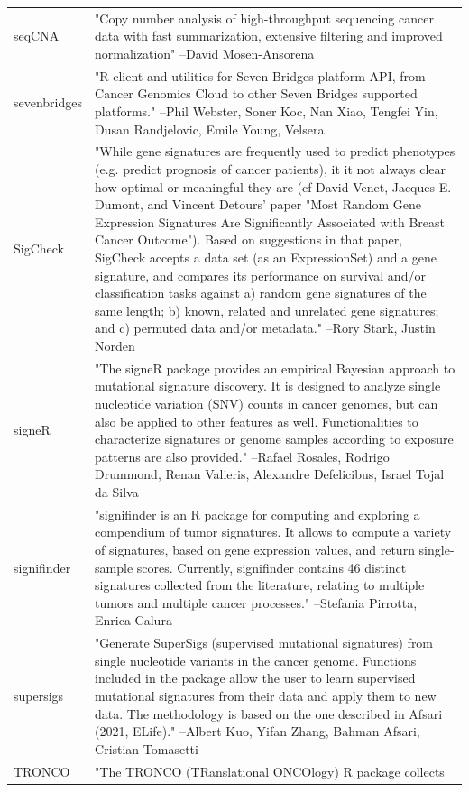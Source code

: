 \begin{longtable}[t]{l>{\raggedright\arraybackslash}p{25em}}
seqCNA & "Copy number analysis of high-throughput sequencing cancer
data with fast summarization, extensive filtering and improved
normalization" --David Mosen-Ansorena\\
sevenbridges & "R client and utilities for Seven Bridges platform API,
from Cancer Genomics Cloud to other Seven Bridges supported
platforms." --Phil Webster, Soner Koc, Nan Xiao, Tengfei Yin, Dusan Randjelovic, Emile Young, Velsera\\
SigCheck & "While gene signatures are frequently used to predict
phenotypes (e.g. predict prognosis of cancer patients), it it
not always clear how optimal or meaningful they are (cf David
Venet, Jacques E. Dumont, and Vincent Detours' paper "Most
Random Gene Expression Signatures Are Significantly Associated
with Breast Cancer Outcome"). Based on suggestions in that
paper, SigCheck accepts a data set (as an ExpressionSet) and a
gene signature, and compares its performance on survival and/or
classification tasks against a) random gene signatures of the
same length; b) known, related and unrelated gene signatures;
and c) permuted data and/or metadata." --Rory Stark, Justin Norden\\
signeR & "The signeR package provides an empirical Bayesian approach
to mutational signature discovery. It is designed to analyze
single nucleotide variation (SNV) counts in cancer genomes, but
can also be applied to other features as well. Functionalities
to characterize signatures or genome samples according to
exposure patterns are also provided." --Rafael Rosales, Rodrigo Drummond, Renan Valieris, Alexandre Defelicibus, Israel Tojal da Silva\\
signifinder & "signifinder is an R package for computing and exploring a
compendium of tumor signatures. It allows to compute a variety
of signatures, based on gene expression values, and return
single-sample scores. Currently, signifinder contains 46
distinct signatures collected from the literature, relating to
multiple tumors and multiple cancer processes." --Stefania Pirrotta, Enrica Calura\\
\addlinespace
supersigs & "Generate SuperSigs (supervised mutational signatures) from
single nucleotide variants in the cancer genome. Functions
included in the package allow the user to learn supervised
mutational signatures from their data and apply them to new
data. The methodology is based on the one described in Afsari
(2021, ELife)." --Albert Kuo, Yifan Zhang, Bahman Afsari, Cristian Tomasetti\\
TRONCO & "The TRONCO (TRanslational ONCOlogy) R package collects

\end{longtable}
